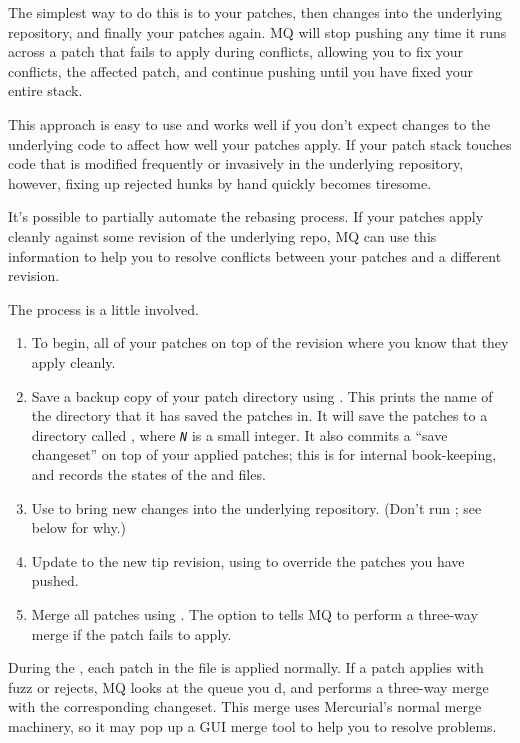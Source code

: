 The simplest way to do this is to 
your patches, then  changes into the underlying
repository, and finally  your
patches again.  MQ will stop pushing any time it runs across a patch
that fails to apply during conflicts, allowing you to fix your
conflicts,  the affected patch, and continue pushing
until you have fixed your entire stack.

This approach is easy to use and works well if you don't expect
changes to the underlying code to affect how well your patches apply.
If your patch stack touches code that is modified frequently or
invasively in the underlying repository, however, fixing up rejected
hunks by hand quickly becomes tiresome.

It's possible to partially automate the rebasing process.  If your
patches apply cleanly against some revision of the underlying repo, MQ
can use this information to help you to resolve conflicts between your
patches and a different revision.

The process is a little involved.
\begin{enumerate}
\item To begin,  all of your patches on top of
  the revision where you know that they apply cleanly.
\item Save a backup copy of your patch directory using
  .  This prints
  the name of the directory that it has saved the patches in.  It will
  save the patches to a directory called
  , where \texttt{\emph{N}} is a small
  integer.  It also commits a ``save changeset'' on top of your
  applied patches; this is for internal book-keeping, and records the
  states of the  and  files.
\item Use  to bring new changes into the underlying
  repository.  (Don't run ; see below for why.)
\item Update to the new tip revision, using
   to override the patches you
  have pushed.
\item Merge all patches using .  The  option to 
  tells MQ to perform a three-way merge if the patch fails to apply.
\end{enumerate}

During the , each patch in the
 file is applied normally.  If a patch applies with
fuzz or rejects, MQ looks at the queue you d, and
performs a three-way merge with the corresponding changeset.  This
merge uses Mercurial's normal merge machinery, so it may pop up a GUI
merge tool to help you to resolve problems.

